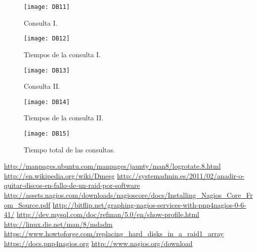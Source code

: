 \documentclass[a4paper, 10pt]{article} %
\begin{document}
\begin{itemize}
\begin{figure}[H]
\centering 
\texttt{[image: DB11]} 
\caption{Consulta I.} 
\label{contexto:figura} 
\end{figure}
\begin{figure}[H]
\centering 
\texttt{[image: DB12]} 
\caption{Tiempos de la consulta I.} 
\label{contexto:figura} 
\end{figure}
\begin{figure}[H]
\centering 
\texttt{[image: DB13]} 
\caption{Consulta II.} 
\label{contexto:figura} 
\end{figure}
\begin{figure}[H]
\centering 
\texttt{[image: DB14]} 
\caption{Tiempos de la consulta II.} 
\label{contexto:figura} 
\end{figure}
\begin{figure}[H]
\centering 
\texttt{[image: DB15]} 
\caption{Tiempo total de las consultas.} 
\label{contexto:figura} 
\end{figure}
\end{itemize}
\begin{thebibliography}{99}
 \url{http://manpages.ubuntu.com/manpages/jaunty/man8/logrotate.8.html}
 \url{http://en.wikipedia.org/wiki/Dmesg}
 \url{http://systemadmin.es/2011/02/anadir-o-quitar-discos-en-fallo-de-un-raid-por-software}
 \url{http://assets.nagios.com/downloads/nagioscore/docs/Installing_Nagios_Core_From_Source.pdf}
 \url{http://bitflip.net/graphing-nagios-services-with-pnp4nagios-0-6-41/}
 \url{http://dev.mysql.com/doc/refman/5.0/en/show-profile.html}
 \url{http://linux.die.net/man/8/mdadm}
 \url{https://www.howtoforge.com/replacing_hard_disks_in_a_raid1_array}
 \url{https://docs.pnp4nagios.org}
 \url{http://www.nagios.org/download}
\end{thebibliography}
\end{document}
